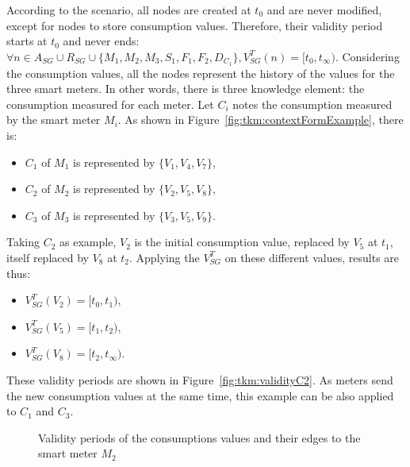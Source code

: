 According to the scenario, all nodes are created at $t_0$ and are never modified, except for nodes to store consumption values.
Therefore, their validity period starts at $t_0$ and never ends: $\forall n \in A_{SG} \cup R_{SG} \cup \{M_1, M_2, M_3, S_1, F_1, F_2, D_{C_1}\}, V^T_{SG}(n) = [t_0, t_\infty)$.
Considering the consumption values, all the nodes represent the history of the values for the three smart meters.
In other words, there is three knowledge element: the consumption measured for each meter.
Let $C_i$ notes the consumption measured by the smart meter $M_i$.
As shown in Figure~\ref{fig:tkm:contextFormExample}, there is:
\begin{itemize}
	\item $C_1$ of $M_1$ is represented by $\{V_1, V_4, V_7\}$,
	\item $C_2$ of $M_2$ is represented by $\{V_2, V_5, V_8\}$,
	\item $C_3$ of $M_3$ is represented by $\{V_3, V_5, V_9\}$.
\end{itemize}
Taking $C_2$ as example, $V_2$ is the initial consumption value, replaced by $V_5$ at $t_1$, itself replaced by $V_8$ at $t_2$. 
Applying the $V_{SG}^T$ on these different values, results are thus:
\begin{itemize}
	\item $V_{SG}^T(V_2) = [t_0, t_1)$,
	\item $V_{SG}^T(V_5) = [t_1, t_2)$,
	\item $V_{SG}^T(V_8) = [t_2, t_\infty)$.
\end{itemize}
These validity periods are shown in Figure~\ref{fig:tkm:validityC2}.
As meters send the new consumption values at the same time, this example can be also applied to $C_1$ and $C_3$.


\begin{figure}
	\centering
	\hfil
	\caption{Validity periods of the consumptions values and their edges to the smart meter $M_2$}
\end{figure}


